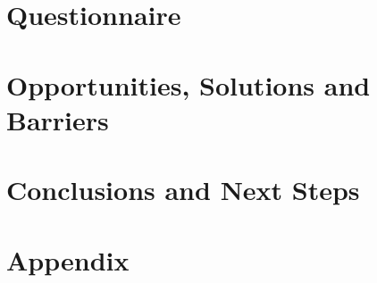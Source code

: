 \documentclass{../style/sig-alternate}
\begin{document}
\section{Questionnaire} 
\label{sec:questionnaire}


\section{Opportunities, Solutions and\\ Barriers} 

\label{sec:opportunities}


\section{Conclusions and Next Steps}

\label{sec:conclusion}


%
%

%

%

\section*{Appendix}
\label{Appendix}

\end{document}
